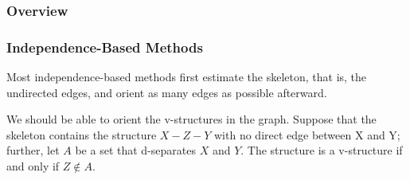 \documentclass{beamer}
\begin{document}
\begin{frame}
    \frametitle{Overview}
\end{frame}

\begin{frame}
    \frametitle{Independence-Based Methods}
    \begin{flushleft}
        Most independence-based methods first estimate the skeleton, that is, the undirected edges, 
        and orient as many edges as possible afterward.
    \end{flushleft}
    \begin{flushleft}
        We should be able to orient the v-structures in the graph. Suppose that
        the skeleton contains the structure $X-Z-Y$ with no direct edge between X and
        Y; further, let $A$ be a set that d-separates $X$ and $Y$. The structure is
        a v-structure if and only if $Z\notin A$.
    \end{flushleft}
\end{frame}
\end{document}
